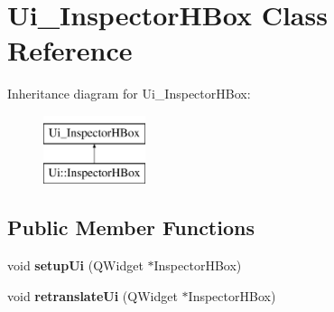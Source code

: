 \hypertarget{class_ui___inspector_h_box}{}\section{Ui\+\_\+\+Inspector\+H\+Box Class Reference}
\label{class_ui___inspector_h_box}
Inheritance diagram for Ui\+\_\+\+Inspector\+H\+Box\+:\begin{figure}[H]
\begin{center}
\leavevmode
\includegraphics[height=2.000000cm]{class_ui___inspector_h_box}
\end{center}
\end{figure}
\subsection*{Public Member Functions}
\begin{DoxyCompactItemize}
\item 
\mbox{\label{class_ui___inspector_h_box_aaefba7b012321cc42d386e4282a53054}} 
void {\bfseries setup\+Ui} (Q\+Widget $\ast$Inspector\+H\+Box)
\item 
\mbox{\label{class_ui___inspector_h_box_a15abb34527c4c5f33df9c0898097ec66}} 
void {\bfseries retranslate\+Ui} (Q\+Widget $\ast$Inspector\+H\+Box)
\end{DoxyCompactItemize}
